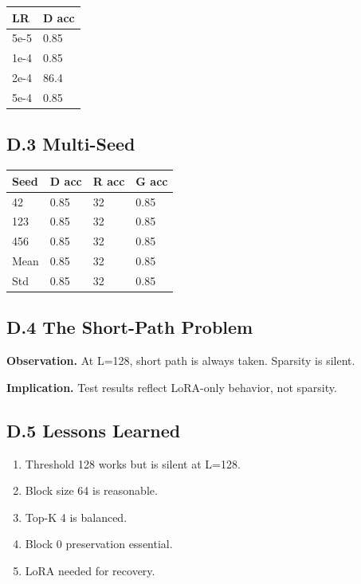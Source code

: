 \begin{table}[H]
\centering
\small
\begin{tabular}{ll}
\toprule
\textbf{LR} & \textbf{D acc} \\
\midrule
5e-5 & 0.85 \\
1e-4 & 0.85 \\
2e-4 & 86.4 \\
5e-4 & 0.85 \\
\bottomrule
\end{tabular}
\end{table}

\subsection{D.3 Multi-Seed}

\begin{table}[H]
\centering
\small
\begin{tabular}{llll}
\toprule
\textbf{Seed} & \textbf{D acc} & \textbf{R acc} & \textbf{G acc} \\
\midrule
42 & 0.85 & 32 & 0.85 \\
123 & 0.85 & 32 & 0.85 \\
456 & 0.85 & 32 & 0.85 \\
Mean & 0.85 & 32 & 0.85 \\
Std & 0.85 & 32 & 0.85 \\
\bottomrule
\end{tabular}
\end{table}

\subsection{D.4 The Short-Path Problem}

\textbf{Observation.} At L=128, short path is always taken. Sparsity is silent.

\textbf{Implication.} Test results reflect LoRA-only behavior, not sparsity.

\subsection{D.5 Lessons Learned}

\begin{enumerate}
\item Threshold 128 works but is silent at L=128.
\item Block size 64 is reasonable.
\item Top-K 4 is balanced.
\item Block 0 preservation essential.
\item LoRA needed for recovery.

\end{enumerate}
